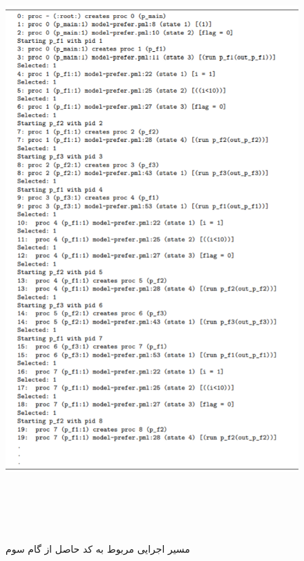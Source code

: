 \begin{figure}
	\centering
	\includegraphics[height=23cm,width=12cm]{l.png}
	\caption{مسیر اجرایی مربوط به کد حاصل از گام سوم}
	\centering
\end{figure}


